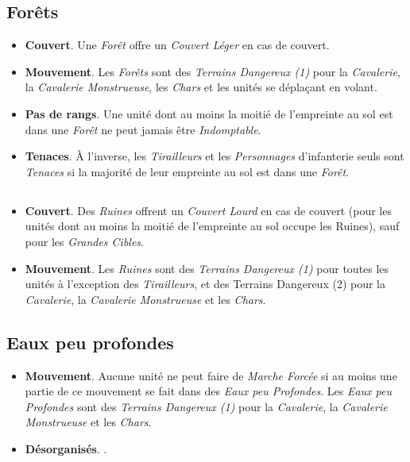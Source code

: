 \subsection{Forêts}

\begin{itemize}[label={-}]
\item \textbf{Couvert}. Une \emph{Forêt} offre un \emph{Couvert Léger} en cas de couvert.
\item \textbf{Mouvement}. Les \emph{Forêts} sont des \emph{Terrains Dangereux (1)} pour la \emph{Cavalerie}, la \emph{Cavalerie Monstrueuse}, les \emph{Chars} et les unités se déplaçant en volant.
\item \textbf{Pas de rangs}. Une unité dont au moins la moitié de l'empreinte au sol est dans une \emph{Forêt} ne peut jamais être \emph{Indomptable}.
\item \textbf{Tenaces}. À l'inverse, les \emph{Tirailleurs} et les \emph{Personnages} d'infanterie seuls sont \emph{Tenaces} si la majorité de leur empreinte au sol est dans une \emph{Forêt}.
\end{itemize}

\subsection{}

\begin{itemize}[label={-}]
\item \textbf{Couvert}. Des \emph{Ruines} offrent un \emph{Couvert Lourd} en cas de couvert (pour les unités dont au moins la moitié de l'empreinte au sol occupe les Ruines), sauf pour les \emph{Grandes Cibles}.
\item \textbf{Mouvement}. Les \emph{Ruines} sont des \emph{Terrains Dangereux (1)} pour toutes les unités à l'exception des \emph{Tirailleurs}, et des Terrains Dangereux (2) pour la \emph{Cavalerie}, la \emph{Cavalerie Monstrueuse} et les \emph{Chars}.
\end{itemize}

\subsection{Eaux peu profondes}

\begin{itemize}[label={-}]
\item \textbf{Mouvement}. Aucune unité ne peut faire de \emph{Marche Forcée} si au moins une partie de ce mouvement se fait dans des \emph{Eaux peu Profondes}. Les \emph{Eaux peu Profondes} sont des \emph{Terrains Dangereux (1)} pour la \emph{Cavalerie}, la \emph{Cavalerie Monstrueuse} et les \emph{Chars}.
\item \textbf{Désorganisés}. .
\end{itemize}

